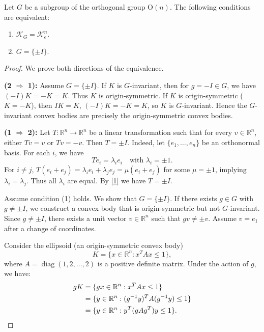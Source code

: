\documentclass[10pt,a4paper]{amsart}
\newcommand{\KG}{\mathcal{K}_{G}}
\newcommand{\On}{\mathrm{O}(n)}
\begin{document}
	\begin{proposition}\label{G=osym}
		Let $G$ be a subgroup of the orthogonal group $\On$. 
		The following conditions are equivalent:
		\begin{enumerate}
			\item $\KG=\mathcal{K}_{e}^{n}$.
			\item $G = \{\pm I\}$.
		\end{enumerate}
	\end{proposition}

	\begin{proof}
		We prove both directions of the equivalence.
		
		\noindent\textbf{(2 $\Rightarrow$ 1):} 
		Assume $G = \{\pm I\}$. 
		If $K$ is $G$-invariant, then for $g = -I \in G$, we have $(-I)K = -K = K$. 
			Thus $K$ is origin-symmetric.
		 If $K$ is origin-symmetric ($K = -K$), then
				$IK = K$, 
				$(-I)K = -K = K$,
			so $K$ is $G$-invariant.
		Hence the $G$-invariant convex bodies are precisely the origin-symmetric convex bodies.
		
		\noindent\textbf{(1 $\Rightarrow$ 2):} 
		Let $T: \mathbb{R}^n \to \mathbb{R}^n$ be a linear transformation such that for every $v \in \mathbb{R}^n$, either $Tv = v$ or $Tv = -v$. Then $T = \pm I$. Indeed, let $\{e_1,\ldots,e_n\}$ be an orthonormal basis. For each $i$, we have
		\begin{equation}\label{1}
			Te_i = \lambda_i e_i \quad \text{with } \lambda_i = \pm1.
		\end{equation}
	  For $i \neq j$, $T(e_{i}+e_{j})=\lambda_i e_i+\lambda_j e_j=\mu(e_{i}+e_{j})$
		for some $\mu = \pm 1$, implying $\lambda_i = \lambda_j$. Thus all $\lambda_i$ are equal. By \eqref{1} we have $T=\pm I$. 
	
		Assume condition (1) holds. We show that $G = \{\pm I\}$.
	If there exists $g \in G$ with $g \neq \pm I$,  we construct a convex body that is origin-symmetric but not $G$-invariant.
		Since $g \neq \pm I$, there exists a unit vector $v \in \mathbb{R}^n$ such that $gv \neq \pm v$. 
		Assume $v = e_1$ after a change of coordinates.
		
		Consider the ellipsoid (an origin-symmetric convex body)
		\begin{equation}\label{elliK}
		K = \{ x \in \mathbb{R}^n : x^T A x \leq 1 \},
		\end{equation}
		where $A = \operatorname{diag}(1, 2, \dots, 2)$ is a positive definite matrix. 
		Under the action of $g$, we have:
		\begin{align}\label{elligK}
		gK &= \{ gx \in \mathbb{R}^n : x^T A x \leq 1 \}\notag\\
		&=\{ y \in \mathbb{R}^n : (g^{-1}y)^T A (g^{-1}y) \leq 1 \}\notag\\
		&=\{ y \in \mathbb{R}^n : y^T (g A g^T) y \leq 1 \}.
		\end{align}
		

\end{proof}
\end{document}

